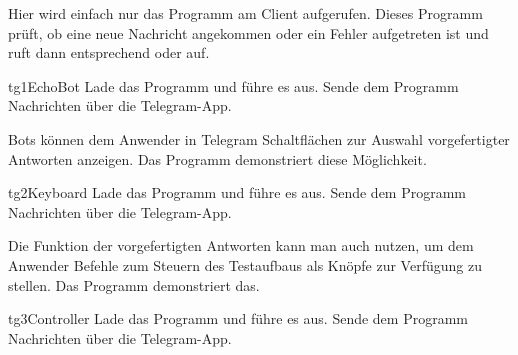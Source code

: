 \begin{multicols}{2}
Hier wird einfach nur das Programm  am Client aufgerufen. Dieses Programm prüft, ob eine neue Nachricht angekommen oder 
ein Fehler aufgetreten ist und ruft dann entsprechend  oder  auf.

\begin{excercise}{tg1}{EchoBot}
Lade das Programm  und führe es aus.
Sende dem Programm Nachrichten über die Telegram-App.
\end{excercise}

Bots können dem Anwender in Telegram Schaltflächen zur Auswahl vorgefertigter Antworten anzeigen. Das Programm 
 demonstriert diese Möglichkeit.

\begin{excercise}{tg2}{Keyboard}
Lade das Programm  und führe es aus.
Sende dem Programm Nachrichten über die Telegram-App.
\end{excercise}

Die Funktion der vorgefertigten Antworten kann man auch nutzen, um dem Anwender Befehle zum Steuern des Testaufbaus
als Knöpfe zur Verfügung zu stellen. Das Programm  demonstriert das.

\begin{excercise}{tg3}{Controller}
Lade das Programm  und führe es aus.
Sende dem Programm Nachrichten über die Telegram-App.
\end{excercise}





\end{multicols}
